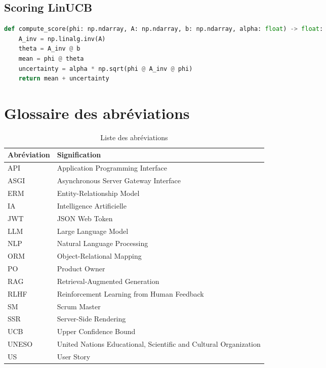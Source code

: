 \subsection{Scoring LinUCB}

\begin{lstlisting}[language=Python, caption=Fonction de scoring LinUCB]
def compute_score(phi: np.ndarray, A: np.ndarray, b: np.ndarray, alpha: float) -> float:
    A_inv = np.linalg.inv(A)
    theta = A_inv @ b
    mean = phi @ theta
    uncertainty = alpha * np.sqrt(phi @ A_inv @ phi)
    return mean + uncertainty
\end{lstlisting}


\section{Glossaire des abréviations}

\begin{table}[H]
    \centering
    \caption{Liste des abréviations}
    \label{tab:abbreviations}
    \small
    \begin{tabular}{p{2cm} p{10cm}}
        \toprule
        \textbf{Abréviation} & \textbf{Signification} \\
        \midrule
        API & Application Programming Interface \\
        ASGI & Asynchronous Server Gateway Interface \\
        ERM & Entity-Relationship Model \\
        IA & Intelligence Artificielle \\
        JWT & JSON Web Token \\
        LLM & Large Language Model \\
        NLP & Natural Language Processing \\
        ORM & Object-Relational Mapping \\
        PO & Product Owner \\
        RAG & Retrieval-Augmented Generation \\
        RLHF & Reinforcement Learning from Human Feedback \\
        SM & Scrum Master \\
        SSR & Server-Side Rendering \\
        UCB & Upper Confidence Bound \\
        UNESO & United Nations Educational, Scientific and Cultural Organization \\
        US & User Story \\
        \bottomrule
    \end{tabular}
\end{table}
